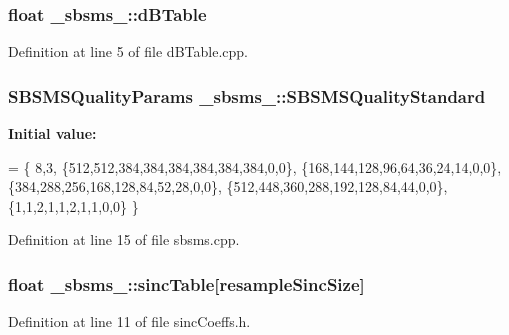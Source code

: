 \subsubsection[{\texorpdfstring{d\+B\+Table}{dBTable}}]{\setlength{\rightskip}{0pt plus 5cm}float \+\_\+sbsms\+\_\+\+::d\+B\+Table}\hypertarget{namespace__sbsms___a3299f3742954168177b5e72c2c58fc28}{}\label{namespace__sbsms___a3299f3742954168177b5e72c2c58fc28}


Definition at line 5 of file d\+B\+Table.\+cpp.

\subsubsection[{\texorpdfstring{S\+B\+S\+M\+S\+Quality\+Standard}{SBSMSQualityStandard}}]{ {\bf S\+B\+S\+M\+S\+Quality\+Params} \+\_\+sbsms\+\_\+\+::\+S\+B\+S\+M\+S\+Quality\+Standard}\hypertarget{namespace__sbsms___add7c6b67483602e252a77ddc635537a8}{}\label{namespace__sbsms___add7c6b67483602e252a77ddc635537a8}
{\bfseries Initial value\+:}
\begin{DoxyCode}
= \{
  8,3,
  \{512,512,384,384,384,384,384,384,0,0\},
  \{168,144,128,96,64,36,24,14,0,0\},
  \{384,288,256,168,128,84,52,28,0,0\},
  \{512,448,360,288,192,128,84,44,0,0\},
  \{1,1,2,1,1,2,1,1,0,0\}
\}
\end{DoxyCode}


Definition at line 15 of file sbsms.\+cpp.

\subsubsection[{\texorpdfstring{sinc\+Table}{sincTable}}]{\setlength{\rightskip}{0pt plus 5cm}float \+\_\+sbsms\+\_\+\+::sinc\+Table\mbox{[}{\bf resample\+Sinc\+Size}\mbox{]}}\hypertarget{namespace__sbsms___a1c3af671988eb8569c007f81fa4644e1}{}\label{namespace__sbsms___a1c3af671988eb8569c007f81fa4644e1}


Definition at line 11 of file sinc\+Coeffs.\+h.

